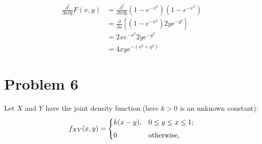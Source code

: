 \documentclass{article}
\newcommand{\1}{\mathbf{1}}
\begin{document}
\begin{align*}
    \frac{\partial^2}{\partial x \partial y} F(x,y) &=  \frac{\partial^2}{\partial x \partial y} (1-e^{-x^2})(1-e^{-x^2}) \\
    &= \frac{\partial}{\partial x} \left[ (1-e^{-x^2}) 2ye^{-y^2} \right] \\
    &=  2xe^{-x^2} 2ye^{-y^2} \\
    &= 4 xy e^{-(x^2+y^2)}
\end{align*}



\newpage
\section*{Problem 6}  Let $X$ and $Y$ have the joint density function (here $k>0$ is an unknown constant):
$$ f_{XY}(x,y) = \begin{cases}
    k(x-y), & 0\leq y\leq x \leq 1;\\[4pt]
    0 & \hbox{otherwise,}
\end{cases}$$
\end{document}
